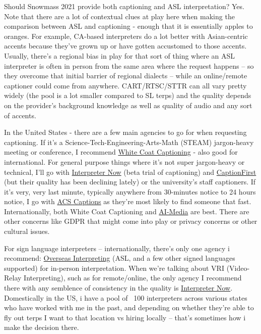 \documentclass{article}
\begin{document}
  Should Snowmass 2021 provide both captioning and ASL interpretation? Yes. Note that there are a lot of contextual clues at play here when making the comparison between ASL and captioning - enough that it is essentially apples to oranges. For example, CA-based interpreters do a lot better with Asian-centric accents because they've grown up or have gotten accustomed to those accents. Usually, there's a regional bias in play for that sort of thing where an ASL interpreter is often in person from the same area where the request happens -- so they overcome that initial barrier of regional dialects -- while an online/remote captioner could come from anywhere. CART/RTSC/STTR can all vary pretty widely (the pool is a lot smaller compared to SL terps) and the quality depends on the provider's background knowledge as well as quality of audio and any sort of accents.

  In the United States - there are a few main agencies to go for when requesting captioning. If it's a Science-Tech-Engineering-Arts-Math (STEAM) jargon-heavy meeting or conference, I recommend \href{https://whitecoatcaptioning.com/}{White Coat Captioning} - also good for international. For general purpose things where it's not super jargon-heavy or technical, I'll go with \href{https://www.interpreter-now.com/}{Interpreter Now} (beta trial of captioning) and \href{https://captionfirst.com/}{CaptionFirst} (but their quality has been declining lately) or the university's staff captioners. If it's very, very last minute, typically anywhere from 30-minutes notice to 24 hours notice, I go with \href{https://www.acscaptions.com/}{ACS Captions} as they're most likely to find someone that fast. Internationally, both White Coat Captioning and \href{https://www.ai-media.tv/}{AI-Media} are best. There are other concerns like GDPR that might come into play or privacy concerns or other cultural issues.

  For sign language interpreters -- internationally, there's only one agency i recommend: \href{http://www.overseasinterpreting.com/}{Overseas Interpreting} (ASL, and a few other signed languages supported) for in-person interpretation. When we're talking about VRI (Video-Relay Interpreting), such as for remote/online, the only agency I recommend there with any semblence of consistency in the quality is \href{https://www.interpreter-now.com/}{Interpreter Now}. Domestically in the US, i have a pool of ~100 interpreters across various states who have worked with me in the past, and depending on whether they're able to fly out terps I want to that location vs hiring locally -- that's sometimes how i make the decision there.
\end{document}
